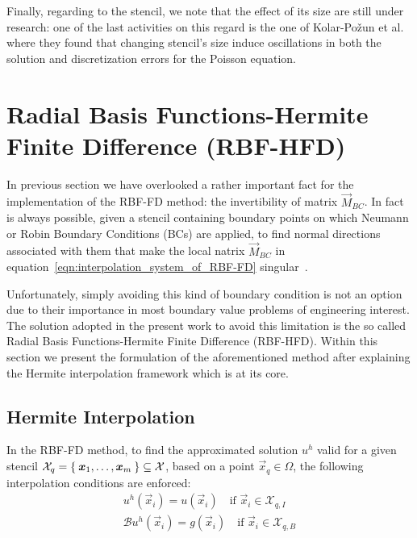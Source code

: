 Finally, regarding to the stencil, we note that the effect of its size are still under research: one of the last activities on this regard is the one of Kolar-Požun et al.~\cite{Kolar-Požun:effect_of_stencil_size} where they found that changing stencil's size induce oscillations in both the solution and discretization errors for the Poisson equation.




\section{Radial Basis Functions-Hermite Finite Difference (RBF-HFD)}

In previous section we have overlooked a rather important fact for the implementation of the RBF-FD method: the invertibility of matrix $\vec{M}_{BC}$. In fact is always possible, given a stencil containing boundary points on which Neumann or Robin Boundary Conditions (BCs) are applied, to find normal directions associated with them that make the local natrix $\vec{M}_{BC}$ in equation~\eqref{eqn:interpolation_system_of_RBF-FD} singular~\cite{Miotti:phd_thesis}.

Unfortunately, simply avoiding this kind of boundary condition is not an option due to their importance in most boundary value problems of engineering interest.
The solution adopted in the present work to avoid this limitation is the so called Radial Basis Functions-Hermite Finite Difference (RBF-HFD).
Within this section we present the formulation of the aforementioned method after explaining the Hermite interpolation framework which is at its core.


\subsection{Hermite Interpolation}

In the RBF-FD method, to find the approximated solution $u^h$ valid for a given stencil $\mathcal{X}_q = \Set{\boldsymbol{x}_1, \dots, \boldsymbol{x}_m} \subseteq \mathcal{X}$, based on a point $\vec{x}_q \in \Omega$, the following interpolation conditions are enforced:
\begin{subequations}
	\label{eqn:interpolation_conditions_on_PDE_Hermite_Interpolation_subsection}
	\begin{gather}
		u^h(\vec{x}_i) = u(\vec{x}_i) \quad \text{if $\vec{x}_i \in \mathcal{X}_{q,I}$}  \label{eqn:u^h_approx_u_conditions_RBF-HFD_section} \\
		\mathcal{B} u^h(\vec{x}_i) = g(\vec{x}_i) \quad \text{if $\vec{x}_i \in \mathcal{X}_{q,B}$} \label{eqn:u^h_approx_conditions_on_boundary_RBF-HFD_section}
	\end{gather}
\end{subequations}

